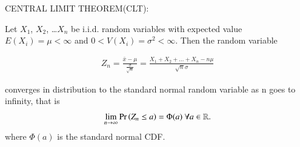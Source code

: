 \documentclass[journal,12pt,twocolumn]{IEEEtran}
\begin{document}
CENTRAL LIMIT THEOREM(CLT):

Let $X_1$, $X_2$, \ldots $X_n$ be i.i.d. random variables with expected value $E(X_i)=\mu < \infty$  and $0 < V(X_i)=\sigma^2 < \infty$. Then the random variable 

\begin{align}
    Z_n = \frac{\bar{x} - \mu}{\frac{\sigma}{\sqrt{n}}} = \frac{X_1 + X_2 + \ldots + X_n - n\mu}{\sqrt{n}\sigma}
\end{align}

converges in distribution to the standard normal random variable as n goes to infinity, that is
\begin{align}
    \lim_{n \to \infty}\Pr\left(Z_n \leq a\right) = \Phi(a)   \text{        }\forall a \in \mathbb{R}.
\end{align}
where $\Phi(a)$ is the standard normal CDF.
\end{document}
